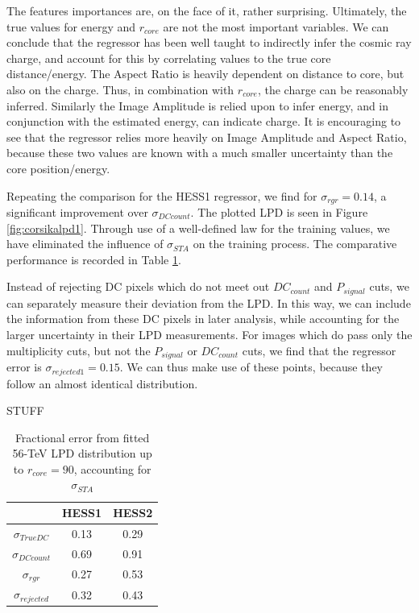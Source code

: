 \documentclass{article}
\begin{document}
The features importances are, on the face of it, rather surprising. Ultimately, the true values for energy and $r_{core}$ are not the most important variables. We can conclude that the regressor has been well taught to indirectly infer the cosmic ray charge, and account for this by correlating values to the true core distance/energy. The Aspect Ratio is heavily dependent on distance to core, but also on the charge. Thus, in combination with $r_{core}$, the charge can be reasonably inferred. Similarly the Image Amplitude is relied upon to infer energy, and in conjunction with the estimated energy, can indicate charge. It is encouraging to see that the regressor relies more heavily on Image Amplitude and Aspect Ratio, because these two values are known with a much smaller uncertainty than the core position/energy.

Repeating the comparison for the HESS1 regressor, we find for $\sigma_{rgr} = 0.14$, a significant improvement over $\sigma_{DCcount}$. The plotted LPD is seen in Figure \ref{fig:corsikalpd1}. Through use of a well-defined law for the training values, we have eliminated the influence of $\sigma_{STA}$ on the training process. The comparative performance is recorded in Table \ref{tab:lpderror}.

Instead of rejecting DC pixels which do not meet out $DC_{count}$ and $P_{signal}$ cuts, we can separately measure their deviation from the LPD. In this way, we can include the information from these DC pixels in later analysis, while accounting for the larger uncertainty in their LPD measurements. For images which do pass only the multiplicity cuts, but not the $P_{signal}$ or $DC_{count}$ cuts, we find that the regressor error is $\sigma_{rejected1}=0.15$. We can thus make use of these points, because they follow an almost identical distribution. 

STUFF

\begin{table}[h!]
  \centering
  \caption{Fractional error from fitted 56-TeV LPD distribution up to $r_{core}=90$, accounting for $\sigma_{STA}$}
  \label{tab:lpderror}
  \begin{tabular}{ccc}
    \toprule
    & HESS1 & HESS2\\
    \midrule
    $\sigma_{TrueDC}$ & 0.13 & 0.29\\
    $\sigma_{DCcount}$ & 0.69 & 0.91\\
    $\sigma_{rgr}$ & 0.27 & 0.53\\ 
    $\sigma_{rejected}$ & 0.32 & 0.43\\ 
    \bottomrule
  \end{tabular}
\end{table}
\end{document}
